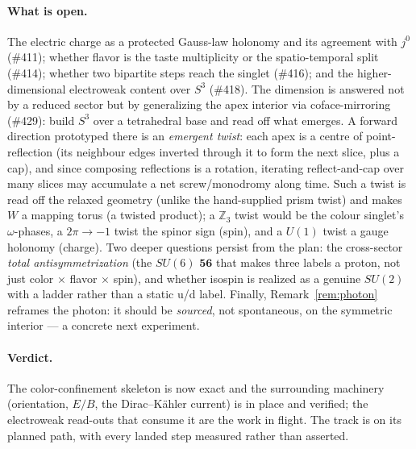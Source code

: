 \documentclass[11pt]{article}
\newcommand{\Z}{\mathbb{Z}}
\begin{document}
\paragraph{What is open.} The electric charge as a protected Gauss-law holonomy and its
agreement with $j^0$ (\#411); whether flavor is the taste multiplicity or the
spatio-temporal split (\#414); whether two bipartite steps reach the singlet (\#416);
and the higher-dimensional electroweak content over $S^3$ (\#418). The dimension is
answered not by a reduced sector but by generalizing the apex interior via
coface-mirroring (\#429): build $S^3$ over a tetrahedral base and read off what emerges.
A forward direction prototyped there is an \emph{emergent twist}: each apex is a centre of
point-reflection (its neighbour edges inverted through it to form the next slice, plus a
cap), and since composing reflections is a rotation, iterating reflect-and-cap over many
slices may accumulate a net screw/monodromy along time. Such a twist is read off the
relaxed geometry (unlike the hand-supplied prism twist) and makes $W$ a mapping torus
(a twisted product); a $\Z_3$ twist would be the colour singlet's $\omega$-phases, a
$2\pi\to-1$ twist the spinor sign (spin), and a $U(1)$ twist a gauge holonomy (charge).
Two deeper questions persist from the plan: the cross-sector
\emph{total antisymmetrization} (the $SU(6)$ $\mathbf{56}$ that makes three labels a
proton, not just color $\times$ flavor $\times$ spin), and whether isospin is realized as
a genuine $SU(2)$ with a ladder rather than a static u/d label. Finally,
Remark~\ref{rem:photon} reframes the photon: it should be \emph{sourced}, not
spontaneous, on the symmetric interior --- a concrete next experiment.

\paragraph{Verdict.} The color-confinement skeleton is now exact and the surrounding
machinery (orientation, $E/B$, the Dirac--K\"ahler current) is in place and verified; the
electroweak read-outs that consume it are the work in flight. The track is on its planned
path, with every landed step measured rather than asserted.
\end{document}
